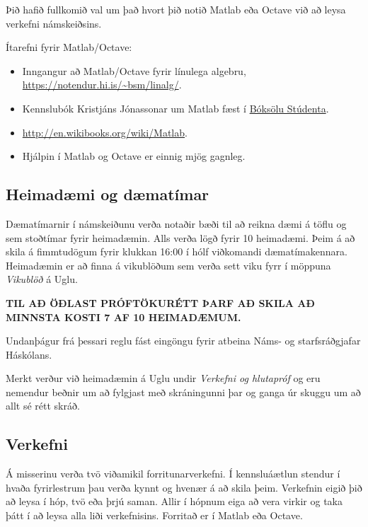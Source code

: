 \documentclass[letterpaper,10pt,icelandic]{sphinxmanual}
\begin{document}
Þið hafið fullkomið val um það hvort þið notið Matlab eða Octave við að leysa verkefni námskeiðsins.

Ítarefni fyrir Matlab/Octave:
\begin{itemize}
\item {} 
Inngangur að Matlab/Octave fyrir línulega algebru, \href{https://notendur.hi.is/~bsm/linalg/}{https://notendur.hi.is/\textasciitilde{}bsm/linalg/}.

\item {} 
Kennslubók Kristjáns Jónassonar um Matlab fæst í \href{http://www.boksala.is/matlab-forritunarmal-fyrir-visindalega-utreikning.html}{Bóksölu Stúdenta}.

\item {} 
\href{http://en.wikibooks.org/wiki/Matlab}{http://en.wikibooks.org/wiki/Matlab}.

\item {} 
Hjálpin í Matlab og Octave er einnig mjög gagnleg.

\end{itemize}


\subsection{Heimadæmi og dæmatímar}
\label{vidauki:heimadaemi-og-daematimar}
Dæmatímarnir í námskeiðunu verða notaðir bæði til að reikna dæmi á töflu og sem stoðtímar fyrir heimadæmin. Alls verða lögð fyrir 10 heimadæmi. Þeim á að skila á fimmtudögum fyrir klukkan 16:00 í hólf viðkomandi dæmatímakennara. Heimadæmin er að finna á vikublöðum sem verða sett viku fyrr í möppuna \emph{Vikublöð} á Uglu.

\textbf{TIL AÐ ÖÐLAST PRÓFTÖKURÉTT ÞARF AÐ SKILA AÐ MINNSTA KOSTI 7 AF 10 HEIMADÆMUM.}

Undanþágur frá þessari reglu fást eingöngu fyrir atbeina Náms- og starfsráðgjafar Háskólans.

Merkt verður við heimadæmin á Uglu undir \emph{Verkefni og hlutapróf} og eru nemendur beðnir um að fylgjast með skráningunni þar og ganga úr skuggu um að allt sé rétt skráð.


\subsection{Verkefni}
\label{vidauki:verkefni}
Á misserinu verða tvö viðamikil forritunarverkefni.
Í kennsluáætlun stendur í hvaða fyrirlestrum þau verða kynnt og hvenær á að skila þeim. Verkefnin eigið þið að leysa í hóp, tvö eða þrjú saman. Allir í hópnum eiga að vera virkir og taka þátt í að leysa alla liði verkefnisins. Forritað er í Matlab eða Octave.
\end{document}
